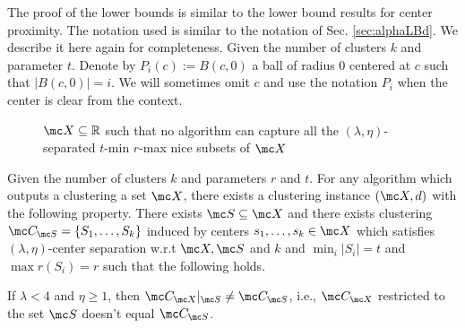\documentclass[11pt]{article}
\begin{document}
\noindent The proof of the lower bounds is similar to the lower bound results for center proximity. The notation used is similar to the notation of Sec. \ref{sec:alphaLBd}. We describe it here again for completeness. Given the number of clusters $k$ and parameter $t$. Denote by $P_{i}(c) := B(c, 0)$ a ball of radius $0$ centered at $c$ such that $|B(c, 0)| = i$. We will sometimes omit $c$ and use the notation $P_i$ when the center is clear from the context. 

\begin{figure}[!ht]

\caption{$\mc X \subseteq \mathbb{R}$ such that no algorithm can capture all the $(\lambda, \eta)$-separated $t$-min $r$-max nice subsets of $\mc X$}
\label{fig:noalglambdacs}
\end{figure}

\begin{theorem}
Given the number of clusters $k$ and parameters $r$ and $t$. For any algorithm which outputs a clustering a set $\mc X$, there exists a clustering instance $(\mc X, d)$ with the following property. There exists $\mc S \subseteq \mc X$ and there exists clustering $\mc C_{\mc S} = \{S_1, \ldots, S_k\}$ induced by centers $s_1, \ldots, s_k \in \mc X$ which satisfies $(\lambda, \eta)$-center separation w.r.t $\mc X, \mc S$ and $k$ and $\min_i |S_i| = t$ and $\max r(S_i) = r$ such that the following holds.

If $\lambda < 4$ and $\eta \ge 1$, then $\mc C_{\mc X}|_{\mc S} \neq \mc C_{\mc S}$, i.e., $\mc C_{\mc X}$ restricted to the set $\mc S$ doesn't equal $\mc C_{\mc S}$.
\end{theorem}
\end{document}
